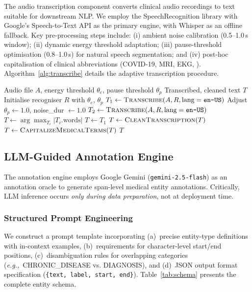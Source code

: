 \documentclass[conference]{IEEEtran}
\newcommand{\eg}{\textit{e.g.,}~}
\begin{document}
The audio transcription component converts clinical audio recordings to
text suitable for downstream NLP. We employ the SpeechRecognition library
with Google's Speech-to-Text API as the primary engine, with Whisper as an
offline fallback. Key pre-processing steps include: (i) ambient noise
calibration (0.5–1.0\,s window); (ii) dynamic energy threshold adaptation;
(iii) pause-threshold optimisation (0.8–1.0\,s) for natural speech
segmentation; and (iv) post-hoc capitalisation of clinical abbreviations
(COVID-19, MRI, EKG, \etc). Algorithm~\ref{alg:transcribe} details the
adaptive transcription procedure.

\begin{algorithm}[t]
\caption{Adaptive Audio Transcription with Quality Enhancement}
\label{alg:transcribe}
\begin{algorithmic}[1]
\REQUIRE Audio file $A$, energy threshold $\theta_e$, pause threshold $\theta_p$
\ENSURE Transcribed, cleaned text $T$
\STATE Initialise recogniser $R$ with $\theta_e$, $\theta_p$
\STATE $T_1 \leftarrow \textsc{Transcribe}(A, R, \text{lang}=\texttt{en-US})$
  \STATE Adjust $\theta_p \leftarrow 1.0$, noise\_dur $\leftarrow 1.0$
  \STATE $T_2 \leftarrow \textsc{Transcribe}(A, R, \text{lang}=\texttt{en-US})$
  \STATE $T \leftarrow \arg\max_{T_i} |T_i.\text{words}|$
\ELSE
  \STATE $T \leftarrow T_1$
\ENDIF
\STATE $T \leftarrow \textsc{CleanTranscription}(T)$
\STATE $T \leftarrow \textsc{CapitalizeMedicalTerms}(T)$
\RETURN $T$
\end{algorithmic}
\end{algorithm}

\subsection{LLM-Guided Annotation Engine}
\label{subsec:annotation}

The annotation engine employs Google Gemini (\texttt{gemini-2.5-flash}) as
an annotation oracle to generate span-level medical entity annotations.
Critically, LLM inference occurs \emph{only during data preparation}, not
at deployment time.

\subsubsection{Structured Prompt Engineering}

We construct a prompt template incorporating (a)~precise entity-type
definitions with in-context examples, (b)~requirements for character-level
start/end positions, (c)~disambiguation rules for overlapping categories
(\eg CHRONIC\_DISEASE vs. DIAGNOSIS), and (d)~JSON output format specification
(\texttt{\{text, label, start, end\}}). Table~\ref{tab:schema} presents the
complete entity schema.
\end{document}
